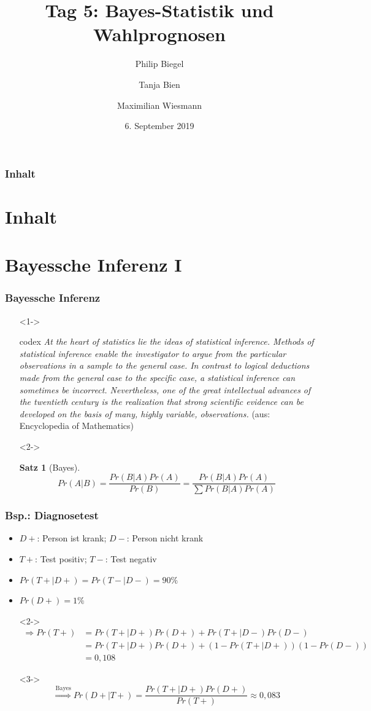 \documentclass[aspectratio=169,xcolor=dvipsnames]{beamer}
\title[Bayes-Statistik \& Wahlprognosen]{\textbf{Tag 5: Bayes-Statistik und Wahlprognosen}}
\author[Philip \and Tanja \and Maximilian]{Philip Biegel \and Tanja Bien \and Maximilian Wiesmann}
\institute[]{Sommerakademie der Studienstiftung Olang - Arbeitsgruppe 4: Empirische Wahlforschung und Wahlprognosen}
\date{6. September 2019}
\newtheorem{satz}{Satz}
\begin{document}
	
\begin{frame}
\titlepage
\end{frame}

\begin{frame}
\frametitle{Inhalt}
\section[Inhalt]{Inhalt}
\tableofcontents
\end{frame}

\section{Bayessche Inferenz I}

\begin{frame}
\frametitle{Bayessche Inferenz}
\begin{itemize}
\item[]<1-> 
\begin{beamercolorbox}[sep=0.5em,wd=\textwidth,shadow=true,rounded=true]{codex}
	\textit{\glqq At the heart of statistics lie the ideas of statistical inference. Methods of statistical inference enable the investigator to argue from the particular observations in a sample to the general case. In contrast to logical deductions made from the general case to the specific case, a statistical inference can sometimes be incorrect. Nevertheless, one of the great intellectual advances of the twentieth century is the realization that strong scientific evidence can be developed on the basis of many, highly variable, observations.\grqq} (aus: Encyclopedia of Mathematics)
\end{beamercolorbox}
\item[]<2->
\begin{satz}[Bayes]
	$$Pr(A|B) = \frac{Pr(B|A)Pr(A)}{Pr(B)} = \frac{Pr(B|A)Pr(A)}{\sum Pr(B|A)Pr(A)}$$
\end{satz}
\end{itemize}
\end{frame}

\begin{frame}
\frametitle{Bsp.: Diagnosetest}
\begin{itemize}
\item<1-> $D+$: Person ist krank; $D-$: Person nicht krank
\item<1-> $T+$: Test positiv; $T-$: Test negativ
\item<1-> $Pr(T+|D+)=Pr(T-|D-)=90\%$
\item<1-> $Pr(D+)=1\%$
\item[]<2-> \begin{align*}
\Rightarrow Pr(T+) & = Pr(T+|D+)Pr(D+) + Pr(T+|D-)Pr(D-)\\ & = Pr(T+|D+)Pr(D+) + (1-Pr(T+|D+))(1-Pr(D-))\\ & = 0,108
\end{align*}
\item[]<3-> $$\overset{\text{Bayes}}{\Rightarrow} Pr(D+|T+) = \frac{Pr(T+|D+)Pr(D+)}{Pr(T+)}\approx 0,083$$
\end{itemize}
\end{frame}
\end{document}
